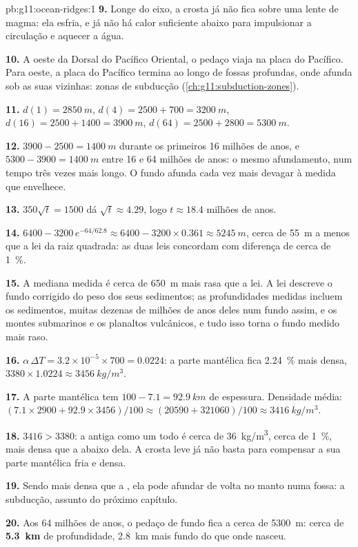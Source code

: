 \begin{solution}{pb:g11:ocean-ridges:1}
\textbf{9.} Longe do eixo, a crosta já não fica sobre uma lente de magma: ela
esfria, e já não há calor suficiente abaixo para impulsionar a circulação e
aquecer a água.

\textbf{10.} A oeste da Dorsal do Pacífico Oriental, o pedaço viaja na placa
do Pacífico. Para oeste, a placa do Pacífico termina ao longo de fossas
profundas, onde afunda sob as suas vizinhas: zonas de subducção
(\cref{ch:g11:subduction-zones}).

\textbf{11.} $d(1) = \qty{2850}{m}$, $d(4) = 2500 + 700 = \qty{3200}{m}$,
$d(16) = 2500 + 1400 = \qty{3900}{m}$, $d(64) = 2500 + 2800 = \qty{5300}{m}$.

\textbf{12.} $3900 - 2500 = \qty{1400}{m}$ durante os primeiros 16 milhões
de anos, e $5300 - 3900 = \qty{1400}{m}$ entre 16 e 64 milhões de anos: o
mesmo afundamento, num tempo três vezes mais longo. O fundo afunda cada vez
mais devagar à medida que envelhece.

\textbf{13.} $350\sqrt{t} = 1500$ dá $\sqrt{t} \approx 4.29$, logo
$t \approx 18.4$ milhões de anos.

\textbf{14.} $6400 - 3200\,e^{-64/62.8} \approx 6400 - 3200 \times 0.361
\approx \qty{5245}{m}$, cerca de \qty{55}{m} a menos que a lei da raiz
quadrada: as duas leis concordam com diferença de cerca de \qty{1}{\percent}.

\textbf{15.} A mediana medida é cerca de \qty{650}{m} mais rasa que a lei. A
lei descreve o fundo corrigido do peso dos seus sedimentos; as
profundidades medidas incluem os sedimentos, muitas dezenas de milhões de
anos deles num fundo assim, e os montes submarinos e os planaltos
vulcânicos, e tudo isso torna o fundo medido mais raso.

\textbf{16.} $\alpha\,\Delta T = 3.2 \times 10^{-5} \times 700 = 0.0224$: a
parte mantélica fica \qty{2.24}{\percent} mais densa,
$3380 \times 1.0224 \approx \qty{3456}{kg/m^3}$.

\textbf{17.} A parte mantélica tem $100 - 7.1 = \qty{92.9}{km}$ de espessura. Densidade
média: $(7.1 \times 2900 + 92.9 \times 3456)/100 \approx (20590 + 321060)/100
\approx \qty{3416}{kg/m^3}$.

\textbf{18.} $3416 > 3380$: a  antiga como um todo é cerca de
\qty{36}{kg/m^3}, cerca de \qty{1}{\percent}, mais densa que a 
abaixo dela. A crosta leve já não basta para compensar a sua parte
mantélica fria e densa.

\textbf{19.} Sendo mais densa que a , ela pode afundar de volta
no manto numa fossa: a subducção, assunto do próximo capítulo.

\textbf{20.} Aos 64 milhões de anos, o pedaço de fundo fica a cerca de
\qty{5300}{m}: cerca de \textbf{5.3~km} de profundidade, \qty{2.8}{km} mais
fundo do que onde nasceu.
\end{solution}
